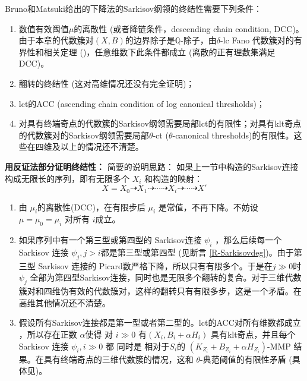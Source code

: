 Bruno和Matsuki\cite{brunoLogSarkisovProgram1995}给出的下降法的Sarkisov纲领的终结性需要下列条件：
\begin{enumerate}
  \item 数值有效阈值$\mu$的离散性 (或者降链条件，descending chain condition, DCC)。由于本章的代数簇对$(X,B)$的边界除子是$\mathbb{Q}$-除子，由$\delta$-lc Fano 代数簇对的有界性和相关定理 (\cite[Theorem 1.1]{birkarSingularitiesLinearSystems2020})，任意维数下此条件都成立 (离散的正有理数集满足DCC)。
  \item 翻转的终结性 (这对高维情况还没有完全证明)； 
  \item lct的ACC (ascending chain condition of log canonical thresholds)；
  \item 对具有终端奇点的代数簇的Sarkisov纲领需要局部lct的有限性；对具有klt奇点的代数簇对的Sarkisov纲领需要局部$\theta$-ct ($\theta$-canonical thresholds)的有限性。这些在四维及以上的情况还不清楚。
\end{enumerate}
\textbf{用反证法部分证明终结性： }
简要的说明思路： 如果上一节中构造的Sarkisov连接构成无限长的序列，即有无限多个 $ X_i $ 和构造的映射：
\[ X=X_0\dashrightarrow X_1\dashrightarrow \cdots\dashrightarrow X_i \dashrightarrow\cdots\dashrightarrow X'\]
\begin{enumerate}
  \item 由 $\mu_{i}$的离散性(DCC)，在有限步后 $\mu_{i}$ 是常值，不再下降。不妨设 $\mu=\mu_{0}=\mu_{i}$ 对所有 $i$成立。
  \item 如果序列中有一个第三型或第四型的 Sarkisov连接 $\psi_i$ ，那么后续每一个 Sarkisov 连接 $\psi_j, j>i$都是第三型或第四型 (见断言 \ref{R-Sarkisovdeg})。由于第三型 Sarkisov 连接的 Picard数严格下降，所以只有有限多个。于是在$j\gg 0$时 $\psi_j$ 全部为第四型Sarkisov连接，同时也是无限多个翻转的复合。对于三维代数簇对和四维伪有效的代数簇对，这样的翻转只有有限多步，这是一个矛盾。在高维其他情况还不清楚。
  \item 假设所有Sarkisov连接都是第一型或者第二型的。lct的ACC对所有维数都成立 \cite{HMX14}，所以存在正数 $\alpha$使得 对 $i\gg 0$ 有$(X_i,B_i+\alpha H_i)$ 具有klt奇点，并且每个Sarkisov 连接 $\psi_i,i\gg 0$ 都 同时是 相对于$S_{i}$的  $(K_{Z_i}+B_{Z_i}+\alpha H_{Z_i})$-MMP 结果。在具有终端奇点的三维代数簇的情况，这和 $\theta$-典范阈值的有限性矛盾 (具体见\cite[Claim 2.2]{brunoLogSarkisovProgram1995})。
\end{enumerate}

